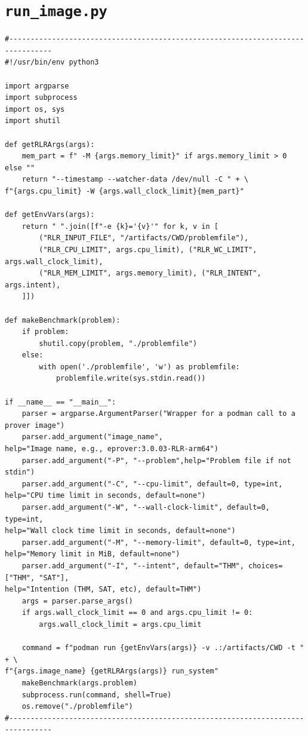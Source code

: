 \documentclass{easychair}
\begin{document}
\section{{\tt run\_image.py}}
\label{run_image}
{\small
\begin{verbatim}
#--------------------------------------------------------------------------------
#!/usr/bin/env python3

import argparse
import subprocess
import os, sys
import shutil

def getRLRArgs(args):
    mem_part = f" -M {args.memory_limit}" if args.memory_limit > 0 else ""
    return "--timestamp --watcher-data /dev/null -C " + \
f"{args.cpu_limit} -W {args.wall_clock_limit}{mem_part}"

def getEnvVars(args):
    return " ".join([f"-e {k}='{v}'" for k, v in [
        ("RLR_INPUT_FILE", "/artifacts/CWD/problemfile"),
        ("RLR_CPU_LIMIT", args.cpu_limit), ("RLR_WC_LIMIT", args.wall_clock_limit),
        ("RLR_MEM_LIMIT", args.memory_limit), ("RLR_INTENT", args.intent),
    ]])

def makeBenchmark(problem):
    if problem:
        shutil.copy(problem, "./problemfile")
    else:
        with open('./problemfile', 'w') as problemfile:
            problemfile.write(sys.stdin.read())

if __name__ == "__main__":
    parser = argparse.ArgumentParser("Wrapper for a podman call to a prover image")
    parser.add_argument("image_name", 
help="Image name, e.g., eprover:3.0.03-RLR-arm64")
    parser.add_argument("-P", "--problem",help="Problem file if not stdin")
    parser.add_argument("-C", "--cpu-limit", default=0, type=int, 
help="CPU time limit in seconds, default=none")
    parser.add_argument("-W", "--wall-clock-limit", default=0, type=int, 
help="Wall clock time limit in seconds, default=none")
    parser.add_argument("-M", "--memory-limit", default=0, type=int, 
help="Memory limit in MiB, default=none")
    parser.add_argument("-I", "--intent", default="THM", choices=["THM", "SAT"], 
help="Intention (THM, SAT, etc), default=THM")
    args = parser.parse_args()
    if args.wall_clock_limit == 0 and args.cpu_limit != 0:
        args.wall_clock_limit = args.cpu_limit

    command = f"podman run {getEnvVars(args)} -v .:/artifacts/CWD -t " + \
f"{args.image_name} {getRLRArgs(args)} run_system"
    makeBenchmark(args.problem)
    subprocess.run(command, shell=True)
    os.remove("./problemfile")
#--------------------------------------------------------------------------------
\end{verbatim}
}
\end{document}
